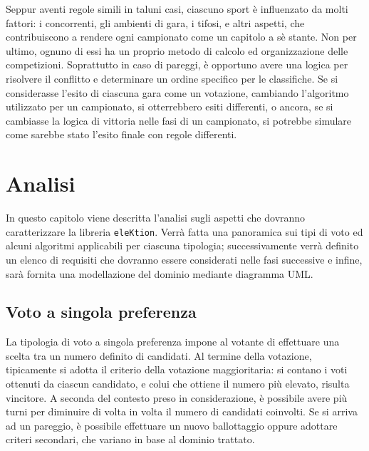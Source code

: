 \documentclass[12pt,a4paper,openright,twoside]{book}
\begin{document}
Seppur aventi regole simili in taluni casi, ciascuno sport è influenzato da molti fattori:
i concorrenti, gli ambienti di gara, i tifosi, e altri aspetti, che contribuiscono a rendere 
ogni campionato come un capitolo a sè stante. 
Non per ultimo, ognuno di essi ha un proprio metodo di calcolo ed organizzazione delle competizioni. 
Soprattutto in caso di pareggi, è opportuno avere una logica per risolvere il conflitto e determinare un ordine specifico per
le classifiche. Se si considerasse l'esito di ciascuna gara come un votazione, cambiando
l'algoritmo utilizzato per un campionato, si otterrebbero esiti differenti, o ancora,
se si cambiasse la logica di vittoria nelle fasi di un campionato, si potrebbe simulare come
sarebbe stato l'esito finale con regole differenti.


\chapter{Analisi}
In questo capitolo viene descritta l'analisi sugli aspetti che dovranno 
caratterizzare la libreria \texttt{eleKtion}. Verrà fatta una panoramica sui tipi di voto
ed alcuni algoritmi applicabili per ciascuna tipologia; successivamente verrà definito un 
elenco di requisiti che dovranno essere considerati nelle fasi successive e infine,
sarà fornita una modellazione del dominio mediante diagramma UML.
\section{Voto a singola preferenza}
La tipologia di voto a singola preferenza impone al votante di effettuare una scelta tra un
numero definito di candidati. Al termine della votazione, tipicamente si adotta il criterio
della votazione maggioritaria: si contano i voti ottenuti da ciascun candidato, e colui che ottiene il
numero più elevato, risulta vincitore. A seconda del contesto preso in considerazione,
è possibile avere più turni per diminuire di volta in volta il numero di candidati coinvolti.
Se si arriva ad un pareggio, è possibile effettuare un nuovo ballottaggio oppure adottare
criteri secondari, che variano in base al dominio trattato.
\end{document}
